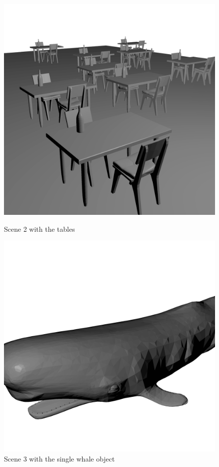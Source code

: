 \documentclass{vgtc}
\begin{document}
\begin{figure}[!htb]
%
  \includegraphics[width=\linewidth]{several_kitchen.png}
  \caption{Scene 2 with the tables}\label{fig:tables}
\endminipage
{}
  \includegraphics[width=\linewidth]{whale.png}
  \caption{Scene 3 with the single whale object}\label{fig:whale_scene}
\endminipage\hfill
\end{figure}
\end{document}
